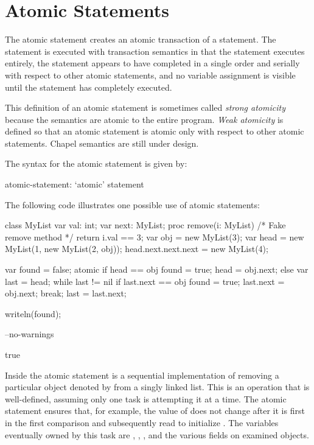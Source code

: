 \section{Atomic Statements}
\label{Atomic_Transactions}
\label{atomicity}

The atomic statement creates an atomic transaction of a statement. The
statement is executed with transaction semantics in that the statement
executes entirely, the statement appears to have completed in a single
order and serially with respect to other atomic statements, and no
variable assignment is visible until the statement has completely
executed.

\begin{openissue}
This definition of an atomic statement is sometimes called {\em strong
atomicity} because the semantics are atomic to the entire program.
{\em Weak atomicity} is defined so that an atomic statement is atomic
only with respect to other atomic statements.  Chapel semantics are
still under design.
\end{openissue}

The syntax for the atomic statement is given by:
\begin{syntax}
atomic-statement:
  `atomic' statement
\end{syntax}

\begin{example}
The following code illustrates one possible use of atomic statements:
\begin{chapelpre}
class MyList {
  var val: int;
  var next: MyList;
  proc remove(i: MyList) {
    /* Fake remove method */
    return i.val == 3;
  }
}
var obj = new MyList(3);
var head = new MyList(1, new MyList(2, obj));
head.next.next.next = new MyList(4);
\end{chapelpre}
\begin{chapel}
var found = false;
atomic {
  if head == obj {
    found = true;
    head = obj.next;
  } else {
    var last = head;
    while last != nil {
      if last.next == obj {
        found = true;
        last.next = obj.next;
        break;
      }
      last = last.next;
    }
  }
}
\end{chapel}
\begin{chapelpost}
writeln(found);
\end{chapelpost}
\begin{chapelcompopts}
--no-warnings
\end{chapelcompopts}
\begin{chapeloutput}
true
\end{chapeloutput}
Inside the atomic statement is a sequential implementation of removing
a particular object denoted by  from a singly linked list.
This is an operation that is well-defined, assuming only one task is
attempting it at a time. The atomic statement ensures that, for
example, the value of  does not change after it is first in
the first comparison and subsequently read to
initialize . The variables eventually owned by this task
are , , , and the various 
fields on examined objects.
\end{example}

